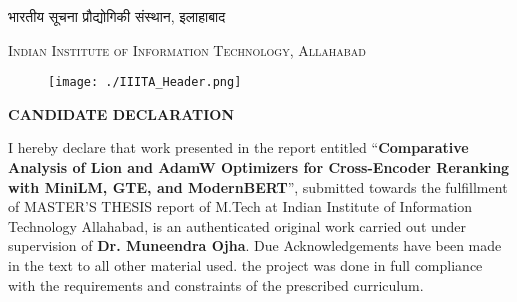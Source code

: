 \begin{titlepage}
\begin{center}
\begin{spacing}{1.2}
\vspace{8mm}
\begin{hindi}
    \textsc{\Large {भारतीय सूचना प्रौद्योगिकी संस्थान, इलाहाबाद}} \\
\end{hindi}
\vspace{3mm}
\textsc{\Large Indian Institute of Information Technology, Allahabad} %

\vspace{5mm}
{\fontsize{14}{14}\selectfont {}}


\end{spacing}
\end{center}
\end{titlepage}



\checktoopen
\begin{figure}[htp]
    \texttt{[image: ./IIITA\_Header.png]}
\end{figure}
\thispagestyle{empty}
\vspace{1mm}

\begin{center}
    {\large\bfseries CANDIDATE DECLARATION}
\end{center}

\begin{spacing}{1.5}
\vspace{10 pt}
I hereby declare that work presented in the report entitled “\textbf{Comparative Analysis of Lion and AdamW Optimizers for Cross-Encoder Reranking with MiniLM, GTE, and ModernBERT}”, submitted towards the fulfillment of MASTER’S THESIS report of M.Tech at Indian Institute of Information Technology Allahabad, is an authenticated original work carried out under supervision of \textbf{Dr. Muneendra Ojha}. Due Acknowledgements have been made in the text to all other material used. the project was done in full compliance with the requirements and constraints of the prescribed curriculum. 
\end{spacing}

\begin{spacing}{2.0}
\begin{flushright}
    \begin{minipage}{0.5\textwidth}
        \flushright \vspace{60 pt}
        \underline{\hspace{6cm}} \\
         \\[80pt]
    \end{minipage}
\end{flushright}
\end{spacing}
\newpage

